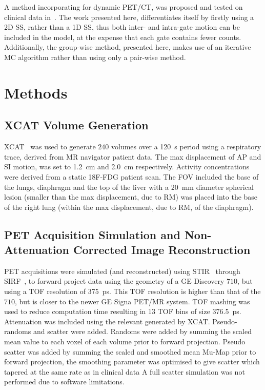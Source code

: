     A method incorporating  for dynamic \gls{PET}/\gls{CT}, was proposed and tested on clinical data in~\cite{Chan2018Non-RigidPET}. The work presented here, differentiates itself by firstly using a \gls{2D} \gls{SS}, rather than a \gls{1D} \gls{SS}, thus both inter- and intra-gate motion can be included in the model, at the expense that each gate contains fewer counts. Additionally, the group-wise method, presented here, makes use of an iterative \gls{MC} algorithm rather than using only a pair-wise method.


\section{Methods} \label{sec:methods}
    \subsection{XCAT Volume Generation} \label{sec:xcat_volume_generation}
        \gls{XCAT}~\cite{Segars2010} was used to generate $240$ volumes over a \SI{120}{\second} period using a respiratory trace, derived from \gls{MR} navigator patient data. The max displacement of \acrlong{AP} and \acrlong{SI} motion, was set to \SI{1.2}{\centi\metre} and \SI{2.0}{\centi\metre} respectively. Activity concentrations were derived from a static \gls{18F-FDG} patient scan. The \gls{FOV} included the base of the lungs, diaphragm and the top of the liver with a \SI{20}{\milli\metre} diameter spherical lesion (smaller than the max displacement, due to \gls{RM}) was placed into the base of the right lung (within the max displacement, due to \gls{RM}, of the diaphragm).
    
    
    \subsection{PET Acquisition Simulation and Non-Attenuation Corrected Image Reconstruction} \label{sec:pet_acquisition_simulation_and_non_attenuation_corrected_image_reconstruction}
        \gls{PET} acquisitions were simulated (and reconstructed) using \gls{STIR}~\cite{Thielemans2012, Nikos2019} through \gls{SIRF}~\cite{Ovtchinnikov2017}, to forward project data using the geometry of a \gls{GE} Discovery $710$, but using a \gls{TOF} resolution of \SI{375}{\pico\second}. This \gls{TOF} resolution is higher than that of the $710$, but is closer to the newer \gls{GE} Signa \gls{PET}/\gls{MR} system. \gls{TOF} mashing was used to reduce computation time resulting in $13$ \gls{TOF} bins of size \SI{376.5}{\pico\second}. Attenuation was included using the relevant  generated by \gls{XCAT}. Pseudo-randoms and scatter were added. Randoms were added by summing the scaled mean value to each voxel of each volume prior to forward projection. Pseudo scatter was added by summing the scaled and smoothed mean \gls{Mu-Map} prior to forward projection, the smoothing parameter was optimised to give scatter which tapered at the same rate as in clinical data A full scatter simulation was not performed due to software limitations.
        
